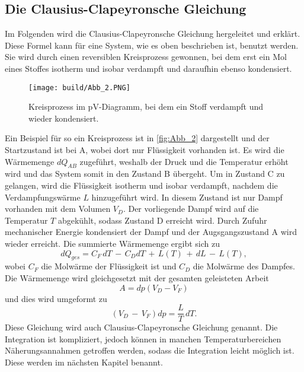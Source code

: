 \subsection{Die Clausius-Clapeyronsche Gleichung} %
\label{sub:CC-Gl}
Im Folgenden wird die Clausius-Clapeyronsche Gleichung hergeleitet und erklärt. 
Diese Formel kann für eine System, wie es oben beschrieben ist, benutzt werden.
Sie wird durch einen reversiblen Kreisprozess gewonnen, bei dem erst ein Mol eines Stoffes isotherm und isobar verdampft und daraufhin ebenso kondensiert.
\begin{figure}[H]
    \centering
    \texttt{[image: build/Abb\_2.PNG]}
    \caption {Kreisprozess im pV-Diagramm, bei dem ein Stoff verdampft und wieder kondensiert.\cite{V203}}
    \label{fig:Abb_2}
\end{figure}
Ein Beispiel für so ein Kreisprozess ist in \autoref{fig:Abb_2} dargestellt und der Startzustand ist bei A, wobei dort nur Flüssigkeit vorhanden ist.
Es wird die Wärmemenge $dQ_{AB}$ zugeführt, weshalb der Druck und die Temperatur erhöht wird und das System somit in den Zustand B übergeht.
Um in Zustand C zu gelangen, wird die Flüssigkeit isotherm und isobar verdampft, nachdem die Verdampfungswärme $L$ hinzugeführt wird.
In diesem Zustand ist nur Dampf vorhanden mit dem Volumen $V_D$.
Der vorliegende Dampf wird auf die Temperatur $T$ abgekühlt, sodass Zustand D erreicht wird.
Durch Zufuhr mechanischer Energie kondensiert der Dampf und der Augsgangszustand A wird wieder erreicht.
Die summierte Wärmemenge ergibt sich zu
\begin{equation}
    dQ_{ges} = C_F\, dT \,-\, C_D dT \,+\, L(T) \,+\, dL \,-\, L(T),
    \label{eqn:Wärmemenge}
\end{equation}
wobei $C_F$ die Molwärme der Flüssigkeit ist und $C_D$ die Molwärme des Dampfes.
Die Wärmemenge wird gleichgesetzt mit der gesamten geleisteten Arbeit
\begin{equation}
    A = dp(V_D-V_F)
    \label{eqn:Arbeit}
\end{equation}
und dies wird umgeformt zu
\begin{equation}
    (V_D\,-\,V_F)dp = \frac{L}{T}\,dT .
    \label{eqn:CC-Gl}
\end{equation}
Diese Gleichung wird auch Clausius-Clapeyronsche Gleichung genannt. 
Die Integration ist kompliziert, jedoch können in manchen Temperaturbereichen Näherungsannahmen getroffen werden, sodass die Integration leicht möglich ist.
Diese werden im nächsten Kapitel benannt.

